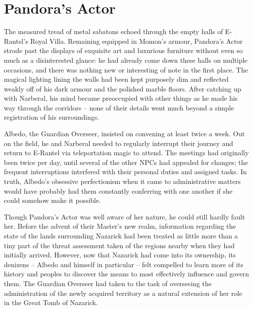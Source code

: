 \chapter{Pandora's Actor}

The measured tread of metal sabatons echoed through the empty halls of E-Rantel’s Royal Villa. Remaining equipped in Momon’s armour, Pandora’s Actor strode past the displays of exquisite art and luxurious furniture without even so much as a disinterested glance: he had already come down these halls on multiple occasions, and there was nothing new or interesting of note in the first place. The magical lighting lining the walls had been kept purposely dim and reflected weakly off of his dark armour and the polished marble floors. After catching up with Narberal, his mind became preoccupied with other things as he made his way through the corridors – none of their details went much beyond a simple registration of his surroundings.

 

Albedo, the Guardian Overseer, insisted on convening at least twice a week. Out on the field, he and Narberal needed to regularly interrupt their journey and return to E-Rantel via teleportation magic to attend. The meetings had originally been twice per day, until several of the other NPCs had appealed for changes; the frequent interruptions interfered with their personal duties and assigned tasks. In truth, Albedo’s obsessive perfectionism when it came to administrative matters would have probably had them constantly conferring with one another if she could somehow make it possible.

 

Though Pandora’s Actor was well aware of her nature, he could still hardly fault her. Before the advent of their Master’s new realm, information regarding the state of the lands surrounding Nazarick had been treated as little more than a tiny part of the threat assessment taken of the regions nearby when they had initially arrived. However, now that Nazarick had come into its ownership, its denizens – Albedo and himself in particular – felt compelled to learn more of its history and peoples to discover the means to most effectively influence and govern them. The Guardian Overseer had taken to the task of overseeing the administration of the newly acquired territory as a natural extension of her role in the Great Tomb of Nazarick.

 

